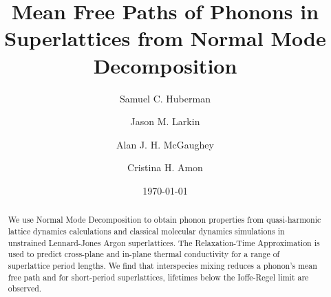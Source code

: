 \documentclass[aps,prb,preprint,preprintnumbers,amsmath,amssymb,floatfix,superscriptaddress]{revtex4}
\begin{document}
\title{Mean Free Paths of Phonons in Superlattices from Normal Mode Decomposition}
\author{Samuel C. Huberman}
\author{Jason M. Larkin}
\author{Alan J. H. McGaughey}
\author{Cristina H. Amon}

\date{\today}%
\vspace{14mm}
  
\begin{abstract}

We use Normal Mode Decomposition to obtain phonon properties from quasi-harmonic lattice dynamics calculations and classical molecular dynamics simulations in unstrained Lennard-Jones Argon superlattices. The Relaxation-Time Approximation is used to predict cross-plane and in-plane thermal conductivity for a range of superlattice period lengths. We find that interspecies mixing reduces a phonon's mean free path and for short-period superlattices, lifetimes below the Ioffe-Regel limit are observed.

\end{abstract}
\maketitle
\end{document}
